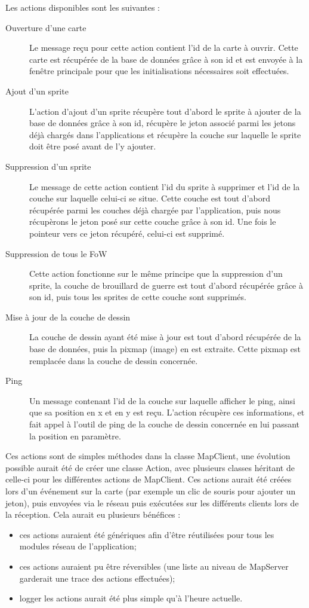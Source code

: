 Les actions disponibles sont les suivantes :
\begin{description}
	\item[Ouverture d'une carte] Le message reçu pour cette action contient l'id de la carte à ouvrir. Cette carte est récupérée de la base de données grâce à son id et est envoyée à la fenêtre principale pour que les initialisations nécessaires soit effectuées.
	\item[Ajout d'un sprite] L'action d'ajout d'un sprite récupère tout d'abord le sprite à ajouter de la base de données grâce à son id, récupère le jeton associé parmi les jetons déjà chargés dans l'applications et récupère la couche sur laquelle le sprite doit être posé avant de l'y ajouter.
	\item[Suppression d'un sprite] Le message de cette action contient l'id du sprite à supprimer et l'id de la couche sur laquelle celui-ci se situe. Cette couche est tout d'abord récupérée parmi les couches déjà chargée par l'application, puis nous récupèrons le jeton posé sur cette couche grâce à son id. Une fois le pointeur vers ce jeton récupéré, celui-ci est supprimé.
	\item[Suppression de tous le FoW] Cette action fonctionne sur le même principe que la suppression d'un sprite, la couche de brouillard de guerre est tout d'abord récupérée grâce à son id, puis tous les sprites de cette couche sont supprimés.
	\item[Mise à jour de la couche de dessin] La couche de dessin ayant été mise à jour est tout d'abord récupérée de la base de données, puis la pixmap (image) en est extraite. Cette pixmap est remplacée dans la couche de dessin concernée.
	\item[Ping] Un message contenant l'id de la couche sur laquelle afficher le ping, ainsi que sa position en x et en y est reçu. L'action récupère ces informations, et fait appel à l'outil de ping de la couche de dessin concernée en lui passant la position en paramètre.
\end{description}
\bigskip

Ces actions sont de simples méthodes dans la classe MapClient, une évolution possible aurait été de créer une classe Action, avec plusieurs classes héritant de celle-ci pour les différentes actions de MapClient. Ces actions aurait été créées lors d'un événement sur la carte (par exemple un clic de souris pour ajouter un jeton), puis envoyées via le réseau puis exécutées sur les différents clients lors de la réception. Cela aurait eu plusieurs bénéfices : 
\begin{itemize}
	\item ces actions auraient été génériques afin d'être réutilisées pour tous les modules réseau de l'application;
	\item ces actions auraient pu être réversibles (une liste au niveau de MapServer garderait une trace des actions effectuées);
	\item logger les actions aurait été plus simple qu'à l'heure actuelle.
\end{itemize}
\newpage

